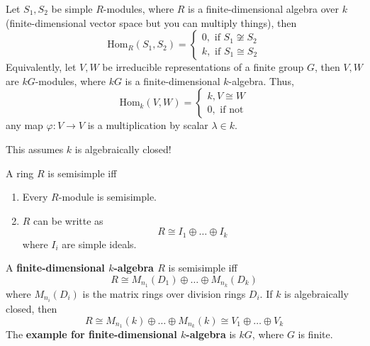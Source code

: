 \documentclass[openany]{book}
\begin{document}
\begin{prop}
    Let $S_1,S_2$ be simple $R$-modules, where $R$ is a finite-dimensional algebra over $k$ (finite-dimensional vector space but you can multiply things), then 
    \begin{equation*}
        \text{Hom}_R(S_1,S_2)=\begin{cases}
            0, \text{ if } S_1\not\cong S_2\\
            k, \text{ if } S_1\cong S_2
        \end{cases}
    \end{equation*}
    Equivalently, let $V,W$ be irreducible representations of a finite group $G$, then $V,W$ are $kG$-modules, where $kG$ is a finite-dimensional $k$-algebra. Thus,
    \begin{equation*}
        \text{Hom}_k(V,W)=\begin{cases}
            k, V\cong W\\
            0, \text{ if not}
        \end{cases}
    \end{equation*}
    any map $\varphi:V\to V$ is a multiplication by scalar $\lambda\in k$. 
    \begin{warn}
        This assumes $k$ is algebraically closed!
    \end{warn}
\end{prop}


\begin{defn}
    A ring $R$ is semisimple iff 
    \begin{enumerate}
        \item Every $R$-module is semisimple.
        \item $R$ can be writte as 
        \begin{equation*}
            R\cong I_1\oplus\dots\oplus I_k
        \end{equation*}
        where $I_i$ are simple ideals.
    \end{enumerate}
\end{defn}


\begin{prop}
    A \textbf{finite-dimensional $k$-algebra $R$} is semisimple iff 
    \begin{equation*}
        R\cong M_{n_1}(D_1)\oplus\dots\oplus M_{n_k}(D_k)
    \end{equation*}
    where $M_{n_i}(D_i)$ is the matrix rings over division rings $D_i$. If $k$ is algebraically closed, then 
    \begin{equation*}
        R\cong M_{n_1}(k)\oplus\dots\oplus M_{n_k}(k)\cong V_1\oplus\dots\oplus V_k
    \end{equation*}
    The \textbf{example for finite-dimensional $k$-algebra} is $kG$, where $G$ is finite.
\end{prop}
\end{document}
